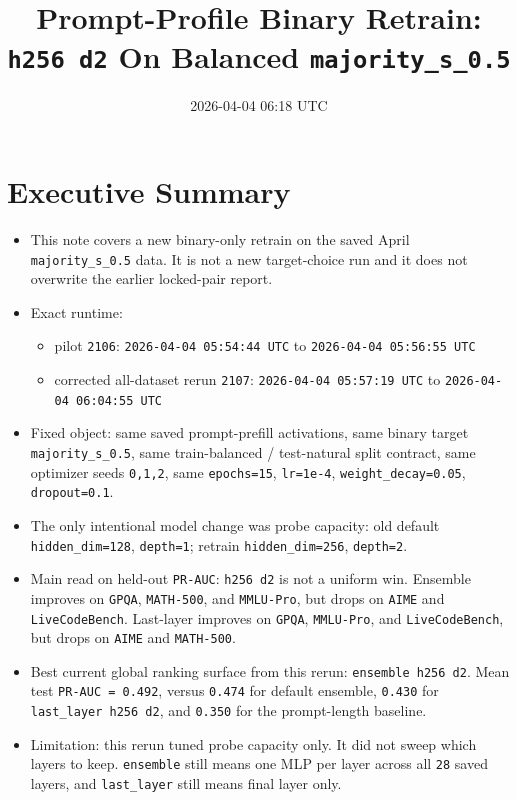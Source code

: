 \documentclass[11pt]{article}
\title{Prompt-Profile Binary Retrain: \texttt{h256 d2} On Balanced \texttt{majority\_s\_0.5}}
\author{}
\date{2026-04-04 06:18 UTC}
\begin{document}
\maketitle

\section*{Executive Summary}
\begin{itemize}[leftmargin=1.5em]
\item This note covers a new binary-only retrain on the saved April \texttt{majority\_s\_0.5} data. It is not a new target-choice run and it does not overwrite the earlier locked-pair report.
\item Exact runtime:
  \begin{itemize}[leftmargin=1.5em]
  \item pilot \texttt{2106}: \texttt{2026-04-04 05:54:44 UTC} to \texttt{2026-04-04 05:56:55 UTC}
  \item corrected all-dataset rerun \texttt{2107}: \texttt{2026-04-04 05:57:19 UTC} to \texttt{2026-04-04 06:04:55 UTC}
  \end{itemize}
\item Fixed object: same saved prompt-prefill activations, same binary target \texttt{majority\_s\_0.5}, same train-balanced / test-natural split contract, same optimizer seeds \texttt{0,1,2}, same \texttt{epochs=15}, \texttt{lr=1e-4}, \texttt{weight\_decay=0.05}, \texttt{dropout=0.1}.
\item The only intentional model change was probe capacity: old default \texttt{hidden\_dim=128}, \texttt{depth=1}; retrain \texttt{hidden\_dim=256}, \texttt{depth=2}.
\item Main read on held-out \texttt{PR-AUC}: \texttt{h256 d2} is not a uniform win. Ensemble improves on \texttt{GPQA}, \texttt{MATH-500}, and \texttt{MMLU-Pro}, but drops on \texttt{AIME} and \texttt{LiveCodeBench}. Last-layer improves on \texttt{GPQA}, \texttt{MMLU-Pro}, and \texttt{LiveCodeBench}, but drops on \texttt{AIME} and \texttt{MATH-500}.
\item Best current global ranking surface from this rerun: \texttt{ensemble h256 d2}. Mean test \texttt{PR-AUC = 0.492}, versus \texttt{0.474} for default ensemble, \texttt{0.430} for \texttt{last\_layer h256 d2}, and \texttt{0.350} for the prompt-length baseline.
\item Limitation: this rerun tuned probe capacity only. It did not sweep which layers to keep. \texttt{ensemble} still means one MLP per layer across all \texttt{28} saved layers, and \texttt{last\_layer} still means final layer only.
\end{itemize}
\end{document}
